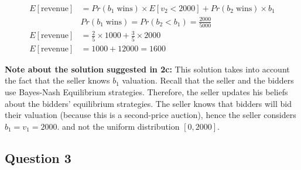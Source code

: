 \documentclass[11pt]{article} %
\begin{document}
        
        \begin{align*}
            E[\text{revenue}] & = Pr(b_1 \; \text{wins}) \times E[v_2<2000] + Pr(b_2 \; \text{wins}) \times b_1 \\
            & Pr(b_1  \; \text{wins}) = Pr(b_2 < b_1) = \frac{2000}{5000} \quad   \\
            E[\text{revenue}] & = \frac{2}{5} \times 1000 + \frac{3}{5} \times  2000 \\
            E[\text{revenue}] & = 1000 + 12000 =1600
        \end{align*}



        \vspace{2em}
        \textbf{Note about the solution suggested in 2c:} This solution takes into account the fact that the seller knows $b_1$ valuation. Recall that the seller and the bidders use Bayes-Nash Equilibrium strategies. Therefore, the seller updates his beliefs about the bidders' equilibrium strategies. The seller knows that bidders will bid their valuation (because this is a second-price auction), hence the seller considers $b_1 = v_1 = 2000$. and not the uniform distribution $[0,2000]$. 
        
        
        \subsection{Question 3}
        
\end{document}
